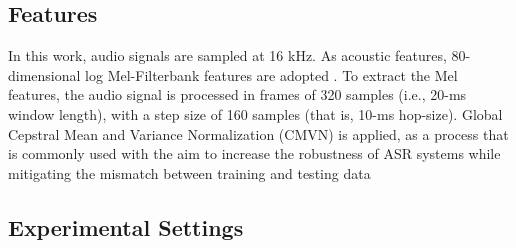 \documentclass[a4paper]{article}
\begin{document}
\subsection{Features}

\begin{table}
\centering
\caption{Results on multi-intent classification. The training set consists of 1 label and the testing set contains utterances with 1 and 2 labels, referred to as FSC-M1-Tst and FSC-M2-Tst.}
\label{tab:res_single}
\end{table}

In this work, audio signals are sampled at 16 kHz. As acoustic features, 80-dimensional log Mel-Filterbank features are adopted \cite{watanabe2018espnet}. To extract the Mel features, the audio signal is processed in frames of 320 samples (i.e., 20-ms window length), with a step size of 160 samples (that is, 10-ms hop-size). Global Cepstral Mean and Variance Normalization (CMVN) is applied, as a process that is commonly used with the aim to increase the robustness of ASR systems while mitigating the mismatch between training and testing data \cite{pujol2006real}\cite{ravanelli2019pytorch}


\subsection{Experimental Settings}
\end{document}
